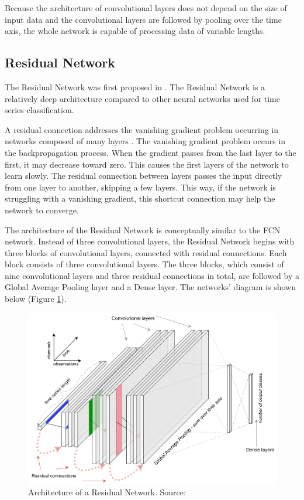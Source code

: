 \documentclass[a4paper,11pt,twoside]{report}
\theoremstyle{definition}
\begin{document}
\FloatBarrier

Because the architecture of convolutional layers does not depend on the size of input data and the convolutional layers are followed by pooling over the time axis, the whole network is capable of processing data of variable lengths.
\subsection{Residual Network}
The Residual Network was first proposed in \cite{residual}. The Residual Network is a relatively deep architecture compared to other neural networks used for time series classification.

A residual connection addresses the vanishing gradient problem occurring in networks composed of many layers \cite{residual}. The vanishing gradient problem occurs in the backpropagation process. When the gradient passes from the last layer to the first, it may decrease toward zero. This causes the first layers of the network to learn slowly. The residual connection between layers passes the input directly from one layer to another, skipping a few layers. This way, if the network is struggling with a vanishing gradient, this shortcut connection may help the network to converge.

The architecture of the Residual Network is conceptually similar to the FCN network. Instead of three convolutional layers, the Residual Network begins with three blocks of convolutional layers, connected with residual connections. Each block consists of three convolutional layers. The three blocks, which consist of nine convolutional layers and three residual connections in total, are followed by a Global Average Pooling layer and a Dense layer. The networks' diagram is shown below (Figure \ref{fig:Resnet_img}).


\FloatBarrier

\begin{figure}[h!]
\centering
\includegraphics[width=14cm]{imgs/resnet.png}
\caption{Architecture of a Residual Network. Source: \cite{dl_tsc}}
\label{fig:Resnet_img}
\end{figure}
\end{document}
